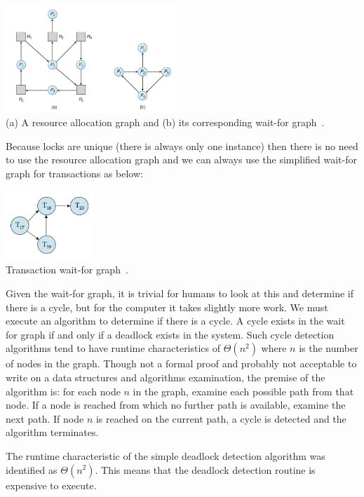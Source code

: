 \begin{center}
\includegraphics[width=0.5\textwidth]{images/rag-waitfor.png}\\
(a) A resource allocation graph and (b) its corresponding wait-for graph~\cite{osc}.
\end{center}

Because locks are unique (there is always only one instance) then there is no need to use the resource allocation graph and we can always use the simplified wait-for graph for transactions as below:

\begin{center}
\includegraphics[width=0.25\textwidth]{images/transaction-waitfor.png}\\
Transaction wait-for graph~\cite{dsc}.
\end{center}


Given the wait-for graph, it is trivial for humans to look at this and determine if there is a cycle, but for the computer it takes slightly more work. We must execute an algorithm to determine if there is a cycle. A cycle exists in the wait for graph if and only if a deadlock exists in the system. Such cycle detection algorithms tend to have runtime characteristics of $\Theta(n^{2})$ where $n$ is the number of nodes in the graph. Though not a formal proof and probably not acceptable to write on a data structures and algorithms examination, the premise of the algorithm is: for each node $n$ in the graph, examine each possible path from that node. If a node is reached from which no further path is available, examine the next path. If node $n$ is reached on the current path, a cycle is detected and the algorithm terminates. 

The runtime characteristic of the simple deadlock detection algorithm was identified as $\Theta(n^{2})$. This means that the deadlock detection routine is expensive to execute.

